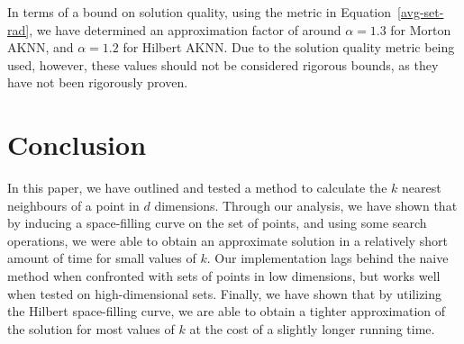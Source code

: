 \documentclass[10pt]{article}
\begin{document}
In terms of a bound on solution quality, using the metric in Equation~\ref{avg-set-rad}, we have determined an approximation factor of around $\alpha=1.3$ for Morton AKNN, and $\alpha=1.2$ for Hilbert AKNN. Due to the solution quality metric being used, however, these values should not be considered rigorous bounds, as they have not been rigorously proven.

\section{Conclusion}

In this paper, we have outlined and tested a method to calculate the $k$ nearest neighbours of a point in $d$ dimensions. Through our analysis, we have shown that by inducing a space-filling curve on the set of points, and using some search operations, we were able to obtain an approximate solution in a relatively short amount of time for small values of $k$. Our implementation lags behind the naive method when confronted with sets of points in low dimensions, but works well when tested on high-dimensional sets. Finally, we have shown that by utilizing the Hilbert space-filling curve, we are able to obtain a tighter approximation of the solution for most values of $k$ at the cost of a slightly longer running time.
\end{document}
